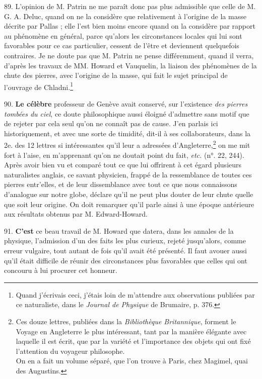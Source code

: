 \documentclass[a4paper, 11pt, oneside, polutonikogreek, french]{article}
\begin{document}
89. L'opinion de M. Patrin ne me paraît donc pas plus admissible que celle de M. G. A. Deluc, quand on ne la considère que relativement à l'origine de la masse décrite par Pallas ; elle l'est bien moins encore quand on la considère par rapport au phénomène en général, parce qu'alors les circonstances locales qui lui sont favorables pour ce cas particulier, cessent de l'être et deviennent quelquefois contraires. Je ne doute pas que M. Patrin ne pense différemment, quand il verra, d'après les travaux de MM. Howard et Vauquelin, la liaison des phénomènes de la chute des pierres, avec l'origine de la masse, qui fait le sujet principal de l'ouvrage de Chladni.\footnote{Quand j'écrivais ceci, j'étais loin de m'attendre aux observations publiées par ce naturaliste, dans le \emph{Journal de Physique} de Brumaire, p. 376.}

90. \textbf{Le célèbre} professeur de Genève avait conservé, sur l'existence \emph{des pierres tombées du ciel}, ce doute philosophique aussi éloigné d'admettre sans motif que de rejeter par cela seul qu'on ne connaît pas de cause. \og J'en parlais ici historiquement, et avec une sorte de timidité, dit-il à ses collaborateurs, dans la 2e. des 12 lettres si intéressantes qu'il leur a adressées d'Angleterre,\footnote{Ces douze lettres, publiées dans la \emph{Bibliothèque Britannique}, forment le Voyage en Angleterre le plus intéressant, tant par la manière élégante avec laquelle il est écrit, que par la variété et l'importance des objets qui ont fixé l'attention du voyageur philosophe.\\
On en a fait un volume séparé, que l'on trouve à Paris, chez Magimel, quai des Augustins.} on me mit fort à l'aise, en m'apprenant qu'on ne doutait point du fait, \emph{etc.} (n°. 22, 244). \fg Après avoir bien vu et comparé tout ce que lui offrirent à cet égard plusieurs naturalistes anglais, ce savant physicien, frappé de la ressemblance de toutes ces pierres entr'elles, et de leur dissemblance avec tout ce que nous connaissons d'analogue sur notre globe, déclare qu'il ne peut plus douter de leur chute quelle que soit leur origine. On doit remarquer qu'il parle ainsi à une époque antérieure aux résultats obtenus par M. Edward-Howard.

91. \textbf{C'est} ce beau travail de M. Howard que datera, dans les annales de la physique, l'admission d'un des faits les plus curieux, rejeté jusqu'alors, comme erreur vulgaire, tout autant de fois qu'il avait été présenté. Il faut avouer aussi qu'il était difficile de réunir des circonstances plus favorables que celles qui ont concouru à lui procurer cet honneur.
\end{document}
